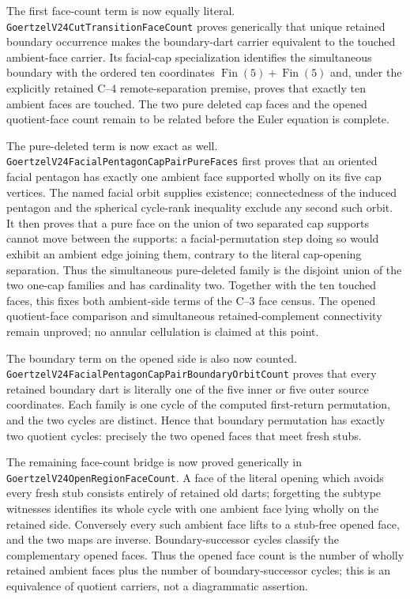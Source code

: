 \documentclass[11pt]{article}
\theoremstyle{definition}
\begin{document}
The first face-count term is now equally literal.
\texttt{GoertzelV24CutTransitionFaceCount} proves generically that unique
retained boundary occurrence makes the boundary-dart carrier equivalent to
the touched ambient-face carrier.  Its facial-cap specialization identifies
the simultaneous boundary with the ordered ten coordinates
$\operatorname{Fin}(5)+\operatorname{Fin}(5)$ and, under the explicitly
retained C--4 remote-separation premise, proves that exactly ten ambient faces
are touched.  The two pure deleted cap faces and the opened quotient-face
count remain to be related before the Euler equation is complete.

The pure-deleted term is now exact as well.
\texttt{GoertzelV24FacialPentagonCapPairPureFaces} first proves that an
oriented facial pentagon has exactly one ambient face supported wholly on its
five cap vertices.  The named facial orbit supplies existence; connectedness
of the induced pentagon and the spherical cycle-rank inequality exclude any
second such orbit.  It then proves that a pure face on the union of two
separated cap supports cannot move between the supports: a
facial-permutation step doing so would exhibit an ambient edge joining them,
contrary to the literal cap-opening separation.  Thus the simultaneous
pure-deleted family is the disjoint union of the two one-cap families and has
cardinality two.  Together with the ten touched faces, this fixes both
ambient-side terms of the C--3 face census.  The opened quotient-face
comparison and simultaneous retained-complement connectivity remain
unproved; no annular cellulation is claimed at this point.

The boundary term on the opened side is also now counted.
\texttt{GoertzelV24FacialPentagonCapPairBoundaryOrbitCount} proves that every
retained boundary dart is literally one of the five inner or five outer source
coordinates.  Each family is one cycle of the computed first-return
permutation, and the two cycles are distinct.  Hence that boundary permutation
has exactly two quotient cycles: precisely the two opened faces that meet
fresh stubs.

The remaining face-count bridge is now proved generically in
\texttt{GoertzelV24OpenRegionFaceCount}.  A face of the literal opening which
avoids every fresh stub consists entirely of retained old darts; forgetting
the subtype witnesses identifies its whole cycle with one ambient face lying
wholly on the retained side.  Conversely every such ambient face lifts to a
stub-free opened face, and the two maps are inverse.  Boundary-successor cycles
classify the complementary opened faces.  Thus the opened face count is the
number of wholly retained ambient faces plus the number of boundary-successor
cycles; this is an equivalence of quotient carriers, not a diagrammatic
assertion.
\end{document}
